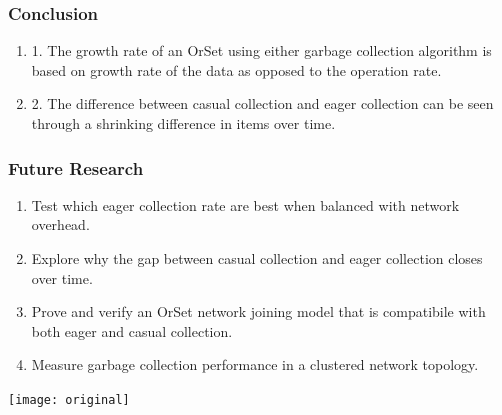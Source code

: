 \documentclass{beamer}
\begin{document}
    \begin{frame}
        \frametitle{Conclusion}

        \begin{center}
        \begin{minipage}{4in}
        \begin{enumerate}
            \item 1. The growth rate of an OrSet using either garbage
                collection algorithm is based on growth rate of
                the data as opposed to the operation rate.
            \bigskip
            \item 2. The difference between casual collection and eager
                collection can be seen through a shrinking difference in
                items over time.
        \end{enumerate}
        \end{minipage}
        \end{center}

    \end{frame}

    \begin{frame}
        \frametitle{Future Research}

        \begin{center}
        \begin{minipage}{4in}
        \begin{enumerate}
            \item Test which eager collection rate are best when
                balanced with network overhead.
            \bigskip
            \item Explore why the gap between casual collection and eager
                collection closes over time.
            \bigskip
            \item Prove and verify an OrSet network joining model that
                is compatibile with both eager and casual collection.
            \bigskip
            \item Measure garbage collection performance in a clustered
                network topology.
        \end{enumerate}
        \end{minipage}
        \end{center}
    \end{frame}

    \begin{frame}
        \texttt{[image: original]}
    \end{frame}
\end{document}

